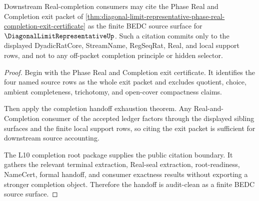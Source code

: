 \begin{theorem}
\label{thm:diagonal-limit-representative-audit-clean-consumer-handoff}
Downstream Real-completion consumers may cite the Phase Real and Completion exit packet of \autoref{thm:diagonal-limit-representative-phase-real-completion-exit-certificate} as the finite BEDC source surface for $\DiagonalLimitRepresentativeUp$. Such a citation commits only to the displayed DyadicRatCore, StreamName, RegSeqRat, Real, and local support rows, and not to any off-packet completion principle or hidden selector.
\end{theorem}
\begin{proof}
Begin with the Phase Real and Completion exit certificate. It identifies the four named source rows as the whole exit packet and excludes quotient, choice, ambient completeness, trichotomy, and open-cover compactness claims.

Then apply the completion handoff exhaustion theorem. Any Real-and-Completion consumer of the accepted ledger factors through the displayed sibling surfaces and the finite local support rows, so citing the exit packet is sufficient for downstream source accounting.

The L10 completion root package supplies the public citation boundary. It gathers the relevant terminal extraction, Real-seal extraction, root-readiness, NameCert, formal handoff, and consumer exactness results without exporting a stronger completion object. Therefore the handoff is audit-clean as a finite BEDC source surface.
\end{proof}

